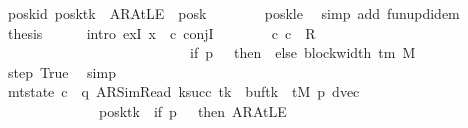 \begin{isabellebody}
\ poskid{\isacharcolon}{\kern0pt}\ {\isachardoublequoteopen}posk{\isacharparenleft}{\kern0pt}tk\ {\isacharcolon}{\kern0pt}{\isacharequal}{\kern0pt}\ AR{\isacharunderscore}{\kern0pt}AtLE{\isacharparenright}{\kern0pt}\ {\isacharequal}{\kern0pt}\ posk{\isachardoublequoteclose}\isanewline
\ \ \ \ \ \ \isamarkupfalse%
\ posk{\isacharunderscore}{\kern0pt}le\ \isamarkupfalse%
\ {\isacharparenleft}{\kern0pt}simp\ add{\isacharcolon}{\kern0pt}\ fun{\isacharunderscore}{\kern0pt}upd{\isacharunderscore}{\kern0pt}idem{\isacharparenright}{\kern0pt}\isanewline
\ \ \ \ \isamarkupfalse%
\ {\isacharquery}{\kern0pt}thesis\isanewline
\ \ \ \ \isamarkupfalse%
\ {\isacharparenleft}{\kern0pt}intro\ exI{\isacharbrackleft}{\kern0pt}\ x\ {\isacharequal}{\kern0pt}\ c{\isacharprime}{\kern0pt}{\isacharprime}{\kern0pt}{\isacharbrackright}{\kern0pt}\ conjI{\isacharparenright}{\kern0pt}\isanewline
\ \ \ \ \ \ \isamarkupfalse%
\ {\isachardoublequoteopen}{\isacharparenleft}{\kern0pt}c{\isacharprime}{\kern0pt}{\isacharcomma}{\kern0pt}\ c{\isacharprime}{\kern0pt}{\isacharprime}{\kern0pt}{\isacharparenright}{\kern0pt}\ {\isasymin}\ R{\isacharprime}{\kern0pt}\isanewline
\ \ \ \ \ \ \ \ \ \ \ \ \ \ \ \ \ \ \ \ \ \ \ \ \ \ {\isacharcircum}{\kern0pt}{\isacharcircum}{\kern0pt}\ {\isacharparenleft}{\kern0pt}if\ p\ {\isacharequal}{\kern0pt}\ {}\ then\ {}\ else\ block{\isacharunderscore}{\kern0pt}width\ {\isacharparenleft}{\kern0pt}{\isasymGamma}{\isacharunderscore}{\kern0pt}tm\ M{\isacharparenright}{\kern0pt}\ {\isacharplus}{\kern0pt}\ {}{\isacharparenright}{\kern0pt}{\isachardoublequoteclose}\isanewline
\ \ \ \ \ \ \ \ \isamarkupfalse%
\ step\ True\ \isamarkupfalse%
\ simp\isanewline
\ \ \ \ \ \ \isamarkupfalse%
\ {\isachardoublequoteopen}mt{\isacharunderscore}{\kern0pt}state\ c{\isacharprime}{\kern0pt}{\isacharprime}{\kern0pt}\ {\isacharequal}{\kern0pt}\ {\isacharparenleft}{\kern0pt}q{\isacharcomma}{\kern0pt}\ AR{\isacharunderscore}{\kern0pt}SimRead{\isacharcomma}{\kern0pt}\ k{\isacharunderscore}{\kern0pt}succ\ tk{\isacharcomma}{\kern0pt}\ {}{\isacharcomma}{\kern0pt}\ buf{\isacharparenleft}{\kern0pt}tk\ {\isacharcolon}{\kern0pt}{\isacharequal}{\kern0pt}\ tM\ p{\isacharparenright}{\kern0pt}{\isacharcomma}{\kern0pt}\ dvec{\isacharcomma}{\kern0pt}\isanewline
\ \ \ \ \ \ \ \ \ \ \ \ \ \ posk{\isacharparenleft}{\kern0pt}tk\ {\isacharcolon}{\kern0pt}{\isacharequal}{\kern0pt}\ if\ p\ {\isacharequal}{\kern0pt}\ {}\ then\ AR{\isacharunderscore}{\kern0pt}AtLE\isanewline

\end{isabellebody}
